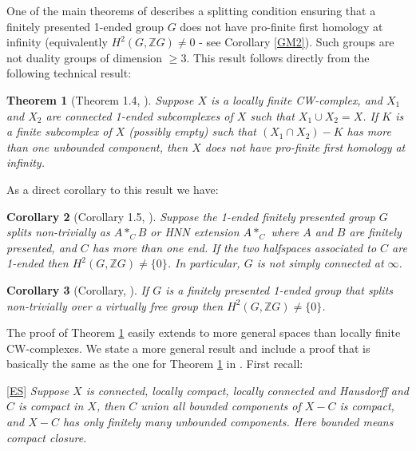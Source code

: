 \documentclass[12pt]{article}
\newtheorem{theorem}{Theorem}[subsection]
\newtheorem{corollary}[theorem]{Corollary}
\begin{document}
One of the main theorems of \cite{MS24} describes a splitting condition ensuring that a finitely presented 1-ended group $G$ does not have pro-finite first homology at infinity (equivalently $H^2(G,\mathbb ZG)\ne 0$ - see  Corollary \ref{GM2}). Such groups are not duality groups of dimension $\geq 3$. This result follows directly from the following technical result:

\begin{theorem} [Theorem 1.4, \cite{MS24}] \label{Acyclic}
Suppose $X$ is a locally finite CW-complex, and $X_1$ and $X_2$ are connected 1-ended subcomplexes of $X$ such that $X_1\cup X_2=X$. If $K$ is a finite subcomplex of $X$ (possibly empty) such that $(X_1\cap X_2)-K$ has more than one unbounded component, then $X$ does not have pro-finite first homology at infinity. 
\end{theorem} 
As a direct corollary to this result we have: 
\begin{corollary} [Corollary 1.5, \cite{MS24}]
Suppose the 1-ended finitely presented group $G$ splits non-trivially as $A\ast_CB$  or HNN extension $A\ast_C$ where $A$ and $B$ are finitely presented, and $C$ has more than one end.
If the two halfspaces associated to $C$ are 1-ended then $H^2(G,\mathbb ZG)\ne \{0\}$. In particular, $G$ is not simply connected at $\infty$.
\end{corollary}

\begin{corollary} [Corollary, \cite{MS24}] If $G$ is a finitely presented 1-ended group that splits non-trivially over a virtually free group then $H^2(G,\mathbb ZG)\ne \{0\}$. 
\end{corollary}

The proof of Theorem \ref{Acyclic} easily extends to more general spaces than locally finite CW-complexes. We state a more general result and include a proof that is basically the same as the one for Theorem \ref{Acyclic} in \cite{MS24}. First recall:

\medskip

 \ref{ES} {\it Suppose $X$ is connected, locally compact, locally connected
and Hausdorff and $C$ is compact in $X$,
then $C$ union all bounded components of $X - C$ is compact, and $X-C$ has only finitely many unbounded components.
Here bounded means compact closure.}
\end{document}
